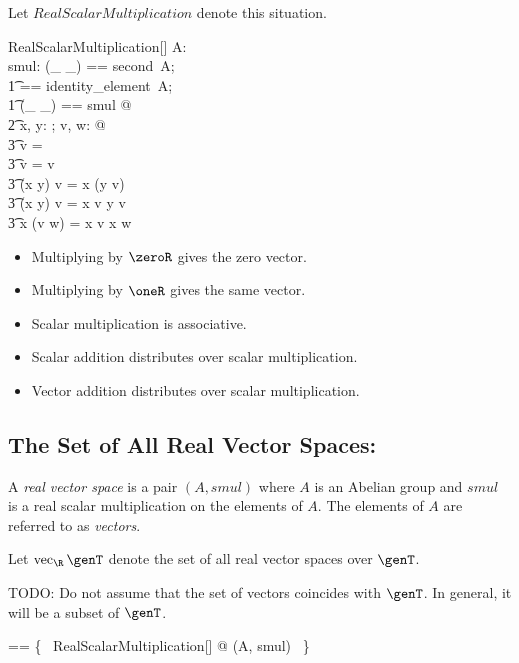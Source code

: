 \documentclass{amsart}
\begin{document}
Let $RealScalarMultiplication$ denote this situation.

\begin{schema}{RealScalarMultiplication}[\genT]
A: \abgroup \genT \\
smul: \R \cross \genT \fun \genT
\where
\LET (\_ \addV \_) == second~A; \\
\t1	\zeroV == identity\_element~A; \\
\t1	(\_ \mulS \_) == smul @ \\
\t2		\forall x, y: \R; v, w: \genT @ \\
\t3			\zeroR \mulS v = \zeroV \land \\
\t3			\oneR \mulS v = v \land \\
\t3			(x \mulR y) \mulS v = x \mulS (y \mulS v) \land \\
\t3			(x \addR y) \mulS v = x \mulS v \addV y \mulS v \land \\
\t3			x \mulS (v \addV w) = x \mulS v \addV x \mulS w
\end{schema}

\begin{itemize}
	\item Multiplying by $\zeroR$ gives the zero vector.
	\item Multiplying by $\oneR$ gives the same vector.
	\item Scalar multiplication is associative.
	\item Scalar addition distributes over scalar multiplication.
	\item Vector addition distributes over scalar multiplication.
\end{itemize}

\subsection{The Set of All Real Vector Spaces: }

A {\em real vector space} is a pair $(A, smul)$ where $A$ is an Abelian group and $smul$
is a real scalar multiplication on the elements of $A$.
The elements of $A$ are referred to as \textit{vectors}.

Let $\vecR \genT$ denote the set of all real vector spaces over $\genT$.

TODO: Do not assume that the set of vectors coincides with $\genT$.
In general, it will be a subset of $\genT$.

\begin{zed}
\vecR \genT == \{~ RealScalarMultiplication[\genT] @ (A, smul) ~\}
\end{zed}
\end{document}
